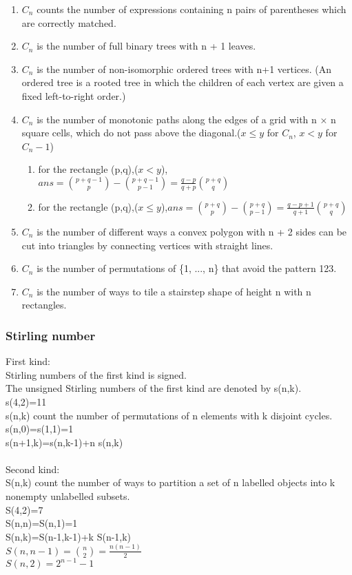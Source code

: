 \begin{enumerate}
\item $C_n$ counts the number of expressions containing n pairs of parentheses which are correctly matched.
\item $C_n$ is the number of full binary trees with n + 1 leaves.
\item $C_n$ is the number of non-isomorphic ordered trees with n+1 vertices. (An ordered tree is a rooted tree in which the children of each vertex are given a fixed left-to-right order.)
\item $C_n$ is the number of monotonic paths along the edges of a grid with n × n square cells, which do not pass above the diagonal.($x\leq y$ for $C_n$, $x<y$ for $C_n-1$)
\begin{enumerate}
\item for the rectangle (p,q),($x<y$), $ans=\binom{p+q-1}{p}-\binom{p+q-1}{p-1}=\frac{q-p}{q+p}\binom{p+q}{q}$
\item for the rectangle (p,q),($x\leq y$),$ans=\binom{p+q}{p}-\binom{p+q}{p-1}=\frac{q-p+1}{q+1}\binom{p+q}{q}$
\end{enumerate}
\item $C_n$ is the number of different ways a convex polygon with n + 2 sides can be cut into triangles by connecting vertices with straight lines.
\item $C_n$ is the number of permutations of \{1, ..., n\} that avoid the pattern 123.
\item $C_n$ is the number of ways to tile a stairstep shape of height n with n rectangles.
\end{enumerate}

\subsubsection{Stirling number}
First kind:\\
Stirling numbers of the first kind is signed.\\
The unsigned Stirling numbers of the first kind are denoted by s(n,k).\\
s(4,2)=11\\
s(n,k) count the number of permutations of n elements with k disjoint cycles.\\
s(n,0)=s(1,1)=1\\
s(n+1,k)=s(n,k-1)+n s(n,k)\\
\\
Second kind:\\
S(n,k) count the number of ways to partition a set of n labelled objects into k nonempty unlabelled subsets.\\
S(4,2)=7\\
S(n,n)=S(n,1)=1\\
S(n,k)=S(n-1,k-1)+k S(n-1,k)\\
$S(n,n-1)=\binom{n}{2}=\frac{n(n-1)}{2}$\\
$S(n,2)=2^{n-1}-1$\\

